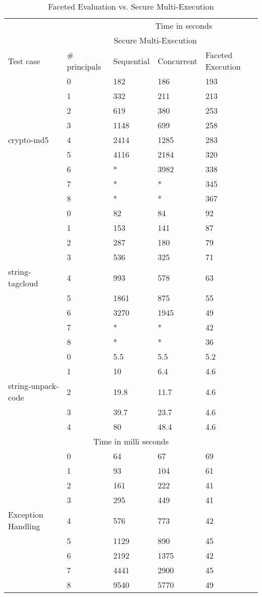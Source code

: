\begin{table}
\begin{tabular}{ |p{3cm}|p{2cm}|p{2cm}|p{2cm}|p{3cm}| }
 \hline
  	 & 	& \multicolumn{3}{|c|}{Time in seconds} \\ \cline{3-5}
  	&	&\multicolumn{2}{|c|}{\footnotesize Secure Multi-Execution}& \\ \cline{3-4}
  	 \footnotesize Test case & \footnotesize \# principals	&\footnotesize Sequential &\footnotesize Concurrent&	\footnotesize Faceted Execution\\
 \hline
    			&0    	&182		&186		&193\\
 			&1  		&332   	&211		&213\\
 			&2 		&619		&380		&253\\
  			&3 		&1148	&699		&258\\
 \footnotesize crypto-md5	&4  		&2414	&1285	&283\\
 			&5  		&4116   	&2184	&320\\
 			&6  		&*		&3982	&338\\
 			&7  		&*		&*		&345\\
 			&8  		&*		&*		&367\\
 \hline
    			&0    	&82		&84		&92\\
 			&1  		&153   	&141		&87\\
 			&2 		&287		&180		&79\\
  			&3 		&536		&325		&71\\
 \footnotesize string-tagcloud		&4  		&993		&578		&63\\
 			&5  		&1861   	&875		&55\\
 			&6  		&3270	&1945	&49\\
 			&7  		&*		&*		&42\\
 			&8  		&*		&*		&36\\
 \hline
    			&0    	&5.5		&5.5		&5.2\\
 			&1  		&10   	&6.4		&4.6\\
 \footnotesize string-unpack-code	&2 		&19.8	&11.7	&4.6\\
  			&3 		&39.7	&23.7	&4.6\\
 			&4  		&80	&48.4	&4.6\\
 \hline
 	\multicolumn{5}{|c|}{Time in milli seconds} \\	
 \hline
    			&0    	&64		&67		&69\\
 			&1  		&93   	&104		&61\\
 			&2 		&161		&222		&41\\
  			&3 		&295		&449		&41\\
 \footnotesize Exception Handling	&4  		&576		&773		&42\\
 			&5  		&1129   	&890		&45\\
 			&6  		&2192	&1375	&42\\
 			&7  		&4441		&2900		&45\\
 			&8  		&9540		&5770		&49\\
 \hline
\end{tabular}
\caption[Faceted Evaluation vs. Secure Multi-Execution]{Faceted Evaluation vs. Secure Multi-Execution } 
\label{tab:results}
\end{table}
